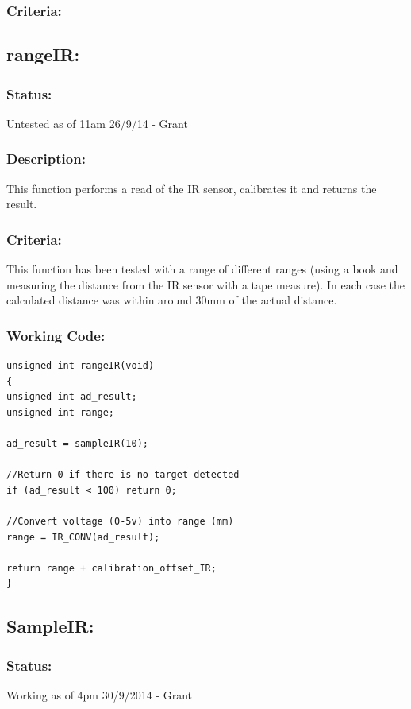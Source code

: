 \documentclass[]{report}
\begin{document}
\subsubsection{Criteria:}

\subsection{rangeIR:}
\subsubsection{Status:}
Untested as of 11am 26/9/14 - Grant

\subsubsection{Description:}
This function performs a read of the IR sensor, calibrates it and returns the result.

\subsubsection{Criteria:}
This function has been tested with a range of different ranges (using a book and measuring the distance from the IR sensor with a tape measure). In each case the calculated distance was within around 30mm of the actual distance.

\subsubsection{Working Code:}
\begin{lstlisting}
unsigned int rangeIR(void)
{
unsigned int ad_result;
unsigned int range;

ad_result = sampleIR(10);

//Return 0 if there is no target detected
if (ad_result < 100) return 0;

//Convert voltage (0-5v) into range (mm)
range = IR_CONV(ad_result);

return range + calibration_offset_IR;
}
\end{lstlisting}

\subsection{SampleIR:}
\subsubsection{Status:}
Working as of 4pm 30/9/2014 - Grant
\end{document}
